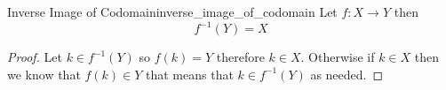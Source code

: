 \begin{proposition}{Inverse Image of Codomain}{inverse_image_of_codomain}
Let \( f : X \to Y  \) then 
\[
f ^{-1} \left( Y \right) = X
\]
\end{proposition}
\begin{proof}
    Let \( k \in  f ^{-1} \left( Y \right)  \) so \( f\left( k \right) = Y \)
    therefore \( k \in  X\). Otherwise if \( k \in  X \)  then we know that \(
    f\left( k \right) \in  Y \) that means that \( k \in  f ^{-1} \left( Y
    \right)  \) as needed.
\end{proof}
